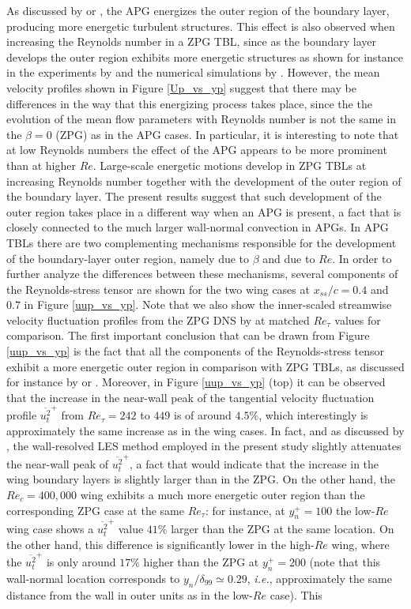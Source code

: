 As discussed by \cite{harun_et_al} or \cite{bobke_et_al}, the APG energizes the outer region of the boundary layer, producing more energetic turbulent structures. This effect is also observed when increasing the Reynolds number in a ZPG TBL, since as the boundary layer develops the outer region exhibits more energetic structures as shown for instance in the experiments by \cite{hutchins_marusic} and the numerical simulations by \cite{eitel_amor_et_al}. However, the mean velocity profiles shown in Figure \ref{Up_vs_yp} suggest that there may be differences in the way that this energizing process takes place, since the the evolution of the mean flow parameters with Reynolds number is not the same in the $\beta=0$ (ZPG) as in the APG cases. In particular, it is interesting to note that at low Reynolds numbers the effect of the APG appears to be more prominent than at higher $Re$. Large-scale energetic motions develop in ZPG TBLs at increasing Reynolds number together with the development of the outer region of the boundary layer. The present results suggest that such development of the outer region takes place in a different way when an APG is present, a fact that is closely connected to the much larger wall-normal convection in APGs. In APG TBLs there are two complementing mechanisms responsible for the development of the boundary-layer outer region, namely due to $\beta$ and due to $Re$. In order to further analyze the differences between these mechanisms, several components of the Reynolds-stress tensor are shown for the two wing cases at $x_{ss}/c=0.4$ and $0.7$ in Figure \ref{uup_vs_yp}. Note that we also show the inner-scaled streamwise velocity fluctuation profiles from the ZPG DNS by \cite{schlatter_orlu10} at matched $Re_{\tau}$ values for comparison. The first important conclusion that can be drawn from Figure \ref{uup_vs_yp} is the fact that all the components of the Reynolds-stress tensor exhibit a more energetic outer region in comparison with ZPG TBLs, as discussed for instance by \cite{kitsios_et_al} or \cite{bobke_et_al}. Moreover, in Figure \ref{uup_vs_yp} (top) it can be observed that the increase in the near-wall peak of the tangential velocity fluctuation profile $\overline{u^{2}_{t}}^{+}$ from $Re_{\tau}=242$ to $449$ is of around $4.5\%$, which interestingly is approximately the same increase as in the wing cases. In fact, and as discussed by \cite{eitel_amor_et_al}, the wall-resolved LES method employed in the present study slightly attenuates the near-wall peak of $\overline{u^{2}_{t}}^{+}$, a fact that would indicate that the increase in the wing boundary layers is slightly larger than in the ZPG. On the other hand, the $Re_{c}=400,000$ wing exhibits a much more energetic outer region than the corresponding ZPG case at the same $Re_{\tau}$: for instance, at $y^{+}_{n} = 100$ the low-$Re$ wing case shows a $\overline{u^{2}_{t}}^{+}$ value $41\%$ larger than the ZPG at the same location. On the other hand, this difference is significantly lower in the high-$Re$ wing, where the $\overline{u^{2}_{t}}^{+}$ is only around $17\%$ higher than the ZPG at $y^{+}_{n}=200$ (note that this wall-normal location corresponds to $y_{n}/\delta_{99} \simeq 0.29$, {\it i.e.}, approximately the same distance from the wall in outer units as in the low-$Re$ case). This 